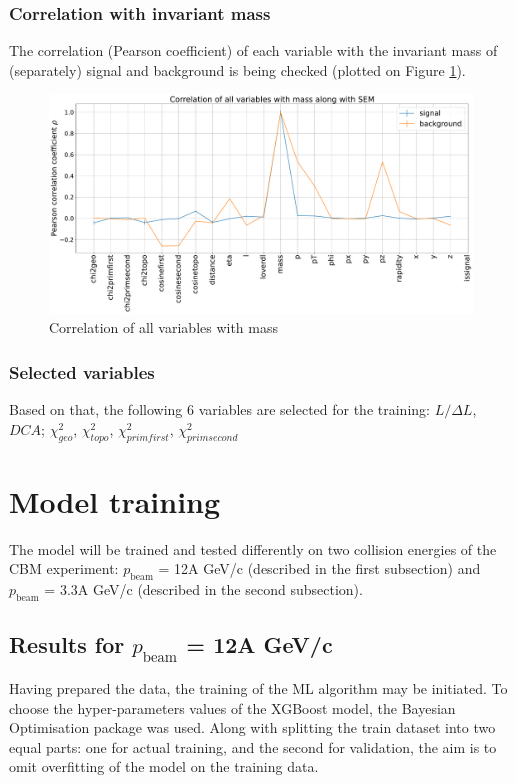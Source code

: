 \subsubsection{Correlation with invariant mass}
The correlation (Pearson coefficient) of each variable with the invariant mass of (separately) signal and background is being checked (plotted on Figure \ref{all variables}).
\begin{figure}[H]
    \centering
    \includegraphics[width=1\textwidth]{img/Correlation_of_all_variables_with_mass_along_with_SEM.pdf}
    \caption{Correlation of all variables with mass}
    \label{all variables}
\end{figure}

\subsubsection{Selected variables}
Based on that, the following 6 variables are selected for the training: $L/\Delta L$, $DCA$;  $\chi^2_{geo}$, $\chi^2_{topo}$, $\chi^2_{prim first}$, $\chi^2_{prim second}$

\section{Model training}
The model will be trained and tested differently on two collision energies of the CBM experiment: $p_{\text{beam}}$ = 12A GeV/c (described in the first subsection) and $p_{\text{beam}}$ = 3.3A GeV/c (described in the second subsection).
\subsection{Results for $p_{\text{beam}}$ = 12A GeV/c}
Having prepared the data, the training of the ML algorithm may be initiated. To choose the hyper-parameters values of the XGBoost model, the Bayesian Optimisation package was used.  Along with splitting the train dataset into two equal parts: one for actual training, and the second for validation, the aim is to omit overfitting of the model on the training data. \\

